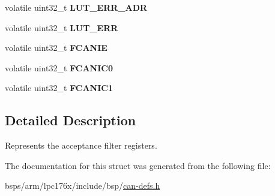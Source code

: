 \begin{DoxyCompactItemize}
volatile uint32\+\_\+t {\bfseries L\+U\+T\+\_\+\+E\+R\+R\+\_\+\+A\+DR}
\item 
\mbox{\label{structcan__acceptance__filter_ad8bf2c3a0d9a1f8f8cd4e4d9e36bc046}} 
volatile uint32\+\_\+t {\bfseries L\+U\+T\+\_\+\+E\+RR}
\item 
\mbox{\label{structcan__acceptance__filter_a189834767c9aa6abda1d13458afc58b6}} 
volatile uint32\+\_\+t {\bfseries F\+C\+A\+N\+IE}
\item 
\mbox{\label{structcan__acceptance__filter_a759b21ec3af17d1cfc39ea93cfbe0eca}} 
volatile uint32\+\_\+t {\bfseries F\+C\+A\+N\+I\+C0}
\item 
\mbox{\label{structcan__acceptance__filter_ac2d81efcc6f5a9ce766e9f08b8168f5f}} 
volatile uint32\+\_\+t {\bfseries F\+C\+A\+N\+I\+C1}
\end{DoxyCompactItemize}


\subsection{Detailed Description}
Represents the acceptance filter registers. 

The documentation for this struct was generated from the following file\+:\begin{DoxyCompactItemize}
\item 
bsps/arm/lpc176x/include/bsp/\mbox{\hyperlink{can-defs_8h}{can-\/defs.\+h}}\end{DoxyCompactItemize}
